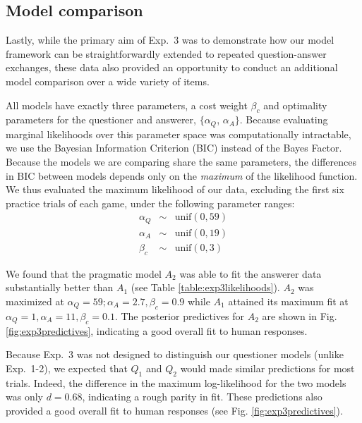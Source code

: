 \documentclass[11pt, floatsintext]{apa6}
\begin{document}
\subsection{Model comparison}

Lastly, while the primary aim of Exp.~3 was to demonstrate how our model framework can be straightforwardly extended to repeated question-answer exchanges, these data also provided an opportunity to conduct an additional model comparison over a wide variety of items.

All models have exactly three parameters, a cost weight $\beta_c$ and optimality parameters for the questioner and answerer, $\{\alpha_Q$, $\alpha_A\}$.
Because evaluating marginal likelihoods over this parameter space was computationally intractable, we use the Bayesian Information Criterion (BIC) instead of the Bayes Factor. 
Because the models we are comparing share the same parameters, the differences in BIC between models depends only on the \emph{maximum} of the likelihood function.
We thus evaluated the maximum likelihood of our data, excluding the first six practice trials of each game, under the following parameter ranges:
$$
\begin{array}{rcl}
\alpha_Q & \sim & \textrm{unif}(0, 59) \\
\alpha_A & \sim & \textrm{unif}(0, 19) \\
\beta_c & \sim & \textrm{unif}(0, 3)
\end{array}
$$

We found that the pragmatic model $A_2$ was able to fit the answerer data substantially better than $A_1$ (see Table \ref{table:exp3likelihoods}).
$A_2$ was maximized at $\alpha_Q = 59; \alpha_A = 2.7, \beta_c = 0.9$ while $A_1$ attained its maximum fit at $\alpha_Q = 1, \alpha_A = 11, \beta_c = 0.1$. 
The posterior predictives for $A_2$ are shown in  Fig. \ref{fig:exp3predictives}, indicating a good overall fit to human responses.

Because Exp.~3 was not designed to distinguish our questioner models (unlike Exp.~1-2), we expected that $Q_1$ and $Q_2$ would made similar predictions for most trials. 
Indeed, the difference in the maximum log-likelihood for the two models was only $d=0.68$, indicating a rough parity in fit.
These predictions also provided a good overall fit to human responses (see Fig. \ref{fig:exp3predictives}).
\end{document}
